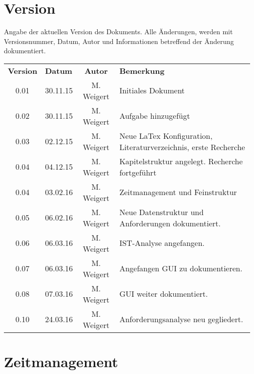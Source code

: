 \chapter*{Version}

Angabe der aktuellen Version des Dokuments. Alle Änderungen, werden mit Versionsnummer, Datum, Autor und Informationen betreffend der Änderung dokumentiert.\\

\begin{tabular}{|c|l|c|l|}
	\rowcolor{black} {\color{white}\textbf{Version}} & {\color{white}\textbf{Datum}} & {\color{white}\textbf{Autor}} & {\color{white}\textbf{Bemerkung}} \\
	0.01 & 30.11.15 & M. Weigert & Initiales Dokument \\ \hline
	\rowcolor{DarkSeaGreen} 0.02 & 30.11.15 & M. Weigert & Aufgabe hinzugefügt \\ \hline
	0.03 & 02.12.15 & M. Weigert & Neue LaTex Konfiguration, Literaturverzeichnis, erste Recherche \\ \hline
	\rowcolor{DarkSeaGreen} 0.04 & 04.12.15 & M. Weigert & Kapitelstruktur angelegt. Recherche fortgeführt \\ \hline
	0.04 & 03.02.16 & M. Weigert & Zeitmanagement und Feinstruktur \\ \hline
	\rowcolor{DarkSeaGreen} 0.05 & 06.02.16 & M. Weigert & Neue Datenstruktur und Anforderungen dokumentiert. \\ \hline
	0.06 & 06.03.16 & M. Weigert & IST-Analyse angefangen. \\ \hline
	\rowcolor{DarkSeaGreen} 0.07 & 06.03.16 & M. Weigert & Angefangen GUI zu dokumentieren. \\ \hline
	0.08 & 07.03.16 & M. Weigert & GUI weiter dokumentiert. \\ \hline
	\rowcolor{DarkSeaGreen} 0.10 & 24.03.16 & M. Weigert & Anforderungsanalyse neu gegliedert. \\ \hline
\end{tabular}

\chapter*{Zeitmanagement}

